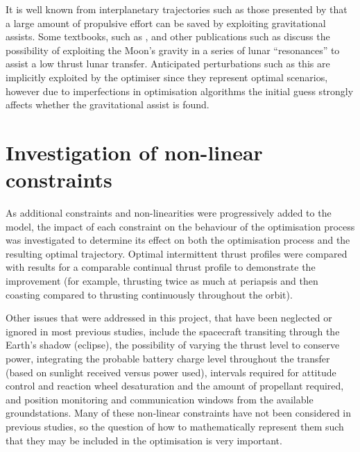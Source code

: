 
It is well known from interplanetary trajectories such as those presented by \textcite{Petukhov2007} that a large amount of propulsive effort can be saved by exploiting gravitational assists. Some textbooks, such as \textcite{Kemble2006}, and other publications such as \textcite{Letterio_thesis} discuss the possibility of exploiting the Moon's gravity in a series of lunar \enquote{resonances} to assist a low thrust lunar transfer. Anticipated perturbations such as this are implicitly exploited by the optimiser since they represent optimal scenarios, however due to imperfections in optimisation algorithms the initial guess strongly affects whether the gravitational assist is found.

\section{Investigation of non-linear constraints} \label{sec:Constraint-objective}

As additional constraints and non-linearities were progressively added to the model, the impact of each constraint on the behaviour of the optimisation process was investigated to determine its effect on both the optimisation process and the resulting optimal trajectory. Optimal intermittent thrust profiles were compared with results for a comparable continual thrust profile to demonstrate the improvement (for example, thrusting twice as much at periapsis and then coasting compared to thrusting continuously throughout the orbit). 

Other issues that were addressed in this project, that have been neglected or ignored in most previous studies, include the spacecraft transiting through the Earth's shadow (eclipse), the possibility of varying the thrust level to conserve power, integrating the probable battery charge level throughout the transfer (based on sunlight received versus power used), intervals required for attitude control and reaction wheel desaturation and the amount of propellant required, and position monitoring and communication windows from the available groundstations. Many of these non-linear constraints have not been considered in previous studies, so the question of how to mathematically represent them such that they may be included in the optimisation is very important.


